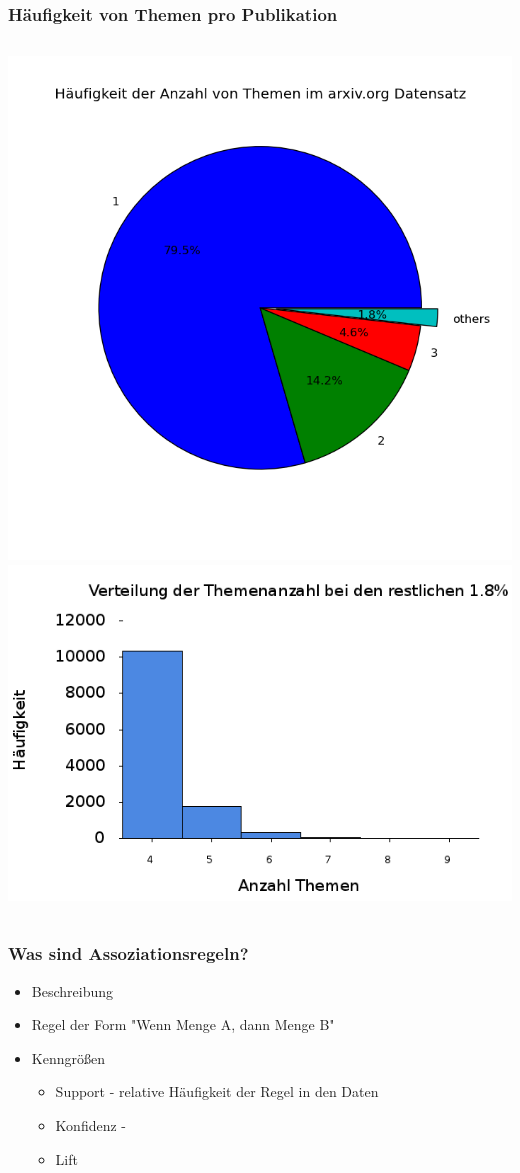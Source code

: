 \documentclass[12pt, xcolor=table]{beamer}
\begin{document}
\begin{frame}
	\frametitle{Häufigkeit von Themen pro Publikation}
	\begin{columns}
    \includegraphics[scale=0.35]{../visual/piechart.png}
    \includegraphics[scale=0.25]{../visual/pieSubplot.png}
	\end{columns}
\end{frame}
\begin{frame}
	\frametitle{Was sind Assoziationsregeln?}
	\begin{itemize}
		\item Beschreibung
		\item Regel der Form "Wenn Menge A, dann Menge B"
		\item Kenngrößen
		\begin{itemize}
			\item Support - relative Häufigkeit der Regel in den Daten
	 		\item Konfidenz - 
	 		\item Lift
	\end{itemize}
	\end{itemize}
\end{frame}
\end{document}
